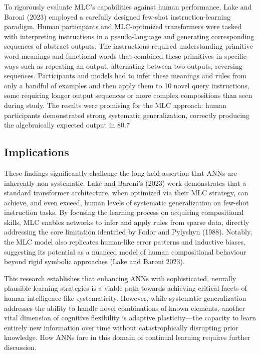 \documentclass[
10pt, %
a4paper, %
oneside, %
headinclude,footinclude, %
BCOR5mm, %
]{scrartcl}
\begin{document}
To rigorously evaluate MLC's capabilities against human performance, Lake and Baroni (2023) employed a carefully designed few-shot instruction-learning paradigm. Human participants and MLC-optimized transformers were tasked with interpreting instructions in a pseudo-language and generating corresponding sequences of abstract outputs. The instructions required understanding primitive word meanings and functional words that combined these primitives in specific ways such as repeating an output, alternating between two outputs, reversing sequences. {Participants and models had to infer these meanings and rules from only a handful of examples and then apply them to 10 novel query instructions, some requiring longer output sequences or more complex compositions than seen during study. } The results were promising for the MLC approach: human participants demonstrated strong systematic generalization, correctly producing the algebraically expected output in 80.7%

\subsection{Implications}

These findings significantly challenge the long-held assertion that ANNs are inherently non-systematic. Lake and Baroni's (2023) work demonstrates that a standard transformer architecture, when optimized via their MLC strategy, can achieve, and even exceed, human levels of systematic generalization on few-shot instruction tasks. By focusing the learning process on acquiring compositional skills, MLC enables networks to infer and apply rules from sparse data, directly addressing the core limitation identified by Fodor and Pylyshyn (1988). {Notably, the MLC model also replicates human-like error patterns and inductive biases, suggesting its potential as a nuanced model of human compositional behaviour beyond rigid symbolic approaches} (Lake and Baroni 2023). 

This research establishes that enhancing ANNs with sophisticated, neurally plausible learning strategies is a viable path towards achieving critical facets of human intelligence like systematicity. However, while systematic generalization addresses the ability to handle novel combinations of known elements, another vital dimension of cognitive flexibility is adaptive plasticity—the capacity to learn entirely new information over time without catastrophically disrupting prior knowledge. How ANNs fare in this domain of continual learning requires further discussion.
\end{document}
